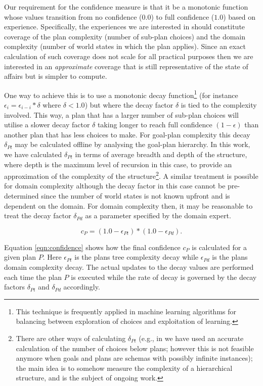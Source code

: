 Our requirement for the confidence measure is that it be a monotonic function whose values transition from no confidence ($0.0$) to full confidence ($1.0$) based on experience. Specifically, the experiences we are interested in should constitute coverage of the plan complexity (number of sub-plan choices) and the domain complexity (number of world states in which the plan applies). Since an exact calculation of such coverage does not scale for all practical purposes then we are interested in an \textit{approximate} coverage that is still representative of the state of affairs but is simpler to compute.

One way to achieve this is to use a monotonic decay function\footnote{This technique is frequently applied in machine learning algorithms for balancing between exploration of choices and exploitation of learning.} (for instance $\epsilon_i = \epsilon_{i-i} * \delta$ where $\delta < 1.0$) but where the decay factor $\delta$ is tied to the complexity involved. This way, a plan that has a larger number of sub-plan choices will utilise a slower decay factor $\delta$ taking longer to reach full confidence $(1-\epsilon)$ than another plan that has less choices to make. For goal-plan complexity this decay $\delta_{Pt}$ may be calculated offline by analysing the goal-plan hierarchy. In this work, we have calculated $\delta_{Pt}$ in terms of average breadth and depth of the structure, where depth is the maximum level of recursion in this case, to provide an approximation of the complexity of the structure\footnote{There are other ways of calculating $\delta_{Pt}$ (e.g., in \cite{Singh:AAMAS10} we have used an accurate calculation of the number of choices below plans; however this is not feasible anymore when goals and plans are schemas with possibly infinite instances); the main idea is to somehow measure the complexity of a hierarchical structure, and is the subject of ongoing work.}. A similar treatment is possible for domain complexity although the decay factor in this case cannot be pre-determined since the number of world states is not known upfront and is dependent on the domain. For domain complexity then, it may be reasonable to treat the decay factor $\delta_{Pd}$ as a parameter specified by the domain expert.

\begin{equation}\label{eqn:confidence}   
c_P = (1.0 - \epsilon_{Pt}) * (1.0 - \epsilon_{Pd}).
\end{equation}

Equation \ref{eqn:confidence} shows how the final confidence $c_P$ is calculated for a given plan $P$. Here $\epsilon_{Pt}$ is the plans tree complexity decay while $\epsilon_{Pd}$ is the plans domain complexity decay. The actual updates to the decay values are performed each time the plan $P$ is executed while the rate of decay is governed by the decay factors $\delta_{Pt}$ and $\delta_{Pd}$ accordingly.


